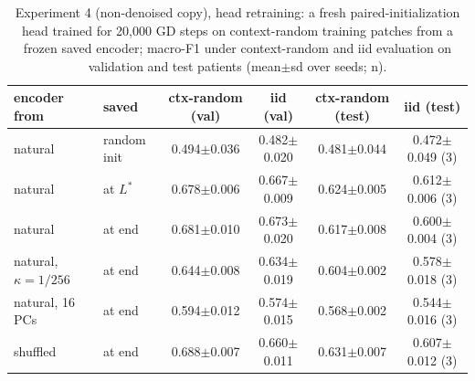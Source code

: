 \begin{table}[htbp]\centering\scriptsize
\caption{Experiment 4 (non-denoised copy), head retraining: a fresh paired-initialization head trained for 20{,}000 GD steps on context-random training patches from a frozen saved encoder; macro-F1 under context-random and iid evaluation on validation and test patients (mean$\pm$sd over seeds; n).}\label{tab:exp4_recovery_nodenoise}
\begin{tabular}{llcccc}\toprule
encoder from & saved & ctx-random (val) & iid (val) & ctx-random (test) & iid (test) \\ \midrule
natural & random init & 0.494$\pm$0.036 & 0.482$\pm$0.020 & 0.481$\pm$0.044 & 0.472$\pm$0.049 (3) \\
natural & at $L^\ast$ & 0.678$\pm$0.006 & 0.667$\pm$0.009 & 0.624$\pm$0.005 & 0.612$\pm$0.006 (3) \\
natural & at end & 0.681$\pm$0.010 & 0.673$\pm$0.020 & 0.617$\pm$0.008 & 0.600$\pm$0.004 (3) \\
natural, $\kappa=1/256$ & at end & 0.644$\pm$0.008 & 0.634$\pm$0.019 & 0.604$\pm$0.002 & 0.578$\pm$0.018 (3) \\
natural, 16 PCs & at end & 0.594$\pm$0.012 & 0.574$\pm$0.015 & 0.568$\pm$0.002 & 0.544$\pm$0.016 (3) \\
shuffled & at end & 0.688$\pm$0.007 & 0.660$\pm$0.011 & 0.631$\pm$0.007 & 0.607$\pm$0.012 (3) \\
\bottomrule\end{tabular}\end{table}
